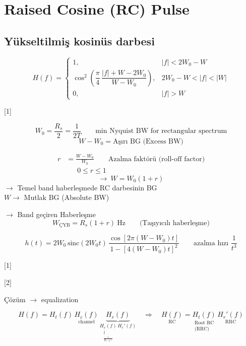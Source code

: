 \documentclass[11pt,a4paper]{article}
\begin{document}

\section{Raised Cosine (RC) Pulse}
\subsection{Yükseltilmiş kosinüs darbesi}

\[
H(f)=\begin{cases}
1, & |f|<2W_0-W\\[4pt]
\cos^2\!\left(\dfrac{\pi}{4}\,\dfrac{|f|+W-2W_0}{W-W_0}\right), & 2W_0-W<|f|<|W|\\[8pt]
0, & |f|>W
\end{cases}
\]

[1]

\[ W_0=\frac{R_s}{2}=\frac{1}{2T}\qquad \text{min Nyquist BW for rectangular spectrum} \]
\[ W-W_0=\text{Aşırı BG (Excess BW)} \]

\[
\begin{aligned}
r&=\frac{W-W_0}{W_0}\qquad \text{Azalma faktörü (roll-off factor)}\\
&\phantom{=}\ 0\le r\le 1
\end{aligned}
\]
\[ \rightarrow\ W=W_0(1+r) \]
$\rightarrow$ Temel band haberleşmede RC darbesinin BG\\
$W\rightarrow$ Mutlak BG (Absolute BW)

$\rightarrow$ Band geçiren Haberleşme
\[ W_{\text{ÇYB}}=R_s(1+r)\ \mathrm{Hz}\qquad \text{(Taşıyıcılı haberleşme)} \]

\[ h(t)=2W_0\,\mathrm{sinc}(2W_0t)\,\frac{\cos[2\pi(W-W_0)t]}{1-[4(W-W_0)t]^2}\qquad \text{azalma hızı }\frac{1}{t^3} \]

[1]

[2]

Çözüm $\rightarrow$ equalization

\[
H(f)=H_t(f)\,\underset{\text{channel}}{H_c(f)}\,
\underbrace{H_r(f)}_{\displaystyle \underset{\substack{\Vert\\ \frac{1}{H_c(f)}}}{H_e(f)}\,H_r'(f)}
\quad\Rightarrow\quad
\underset{\text{RC}}{H(f)}=\underset{\substack{\text{Root RC}\\ \text{(RRC)}}}{H_t(f)}\,\underset{\text{RRC}}{H_r'(f)}
\]
\end{document}

